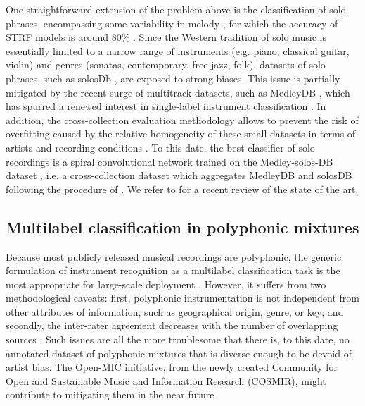 \documentclass{article}
\makeatletter
\newcommand*{\eg}{e.g.\@\xspace}
\newcommand*{\ie}{i.e.\@\xspace}
\makeatother
\begin{document}
One straightforward extension of the problem above is the classification of solo phrases, encompassing some variability in melody \cite{krishna2004icassp}, for which the accuracy of STRF models is around $80\%$ \cite{patil2015eurasip}.
Since the Western tradition of solo music is essentially limited to a narrow range of instruments (\eg{} piano, classical guitar, violin) and genres (sonatas, contemporary, free jazz, folk), datasets of solo phrases, such as solosDb \cite{joder2009taslp}, are exposed to strong biases.
This issue is partially mitigated by the recent surge of multitrack datasets, such as MedleyDB \cite{bittner2014ismir}, which has spurred a renewed interest in single-label instrument classification \cite{yip2017ismir}.
In addition, the cross-collection evaluation methodology \cite{livshin2003ismir} allows to prevent the risk of overfitting caused by the relative homogeneity of these small datasets in terms of artists and recording conditions \cite{bogdanov2016ismir}.
To this date, the best classifier of solo recordings is a spiral convolutional network \cite{lostanlen2016ismir} trained on the Medley-solos-DB dataset \cite{lostanlen2018msdb}, \ie{} a cross-collection dataset which aggregates MedleyDB and solosDB following the procedure of \cite{donnelly2015icdmw}.
We refer to \cite{han2017taslp} for a recent review of the state of the art.

\subsection{Multilabel classification in polyphonic mixtures}
Because most publicly released musical recordings are polyphonic, the generic formulation of instrument recognition as a multilabel classification task is the most appropriate for large-scale deployment \cite{martins2007ismir,burred2009icassp}.
However, it suffers from two methodological caveats: first, polyphonic instrumentation is not independent from other attributes of information, such as geographical origin, genre, or key; and secondly, the inter-rater agreement decreases with the number of overlapping sources \cite[chapter 6]{fuhrmann2012phd}.
Such issues are all the more troublesome that there is, to this date, no  annotated dataset of polyphonic mixtures that is diverse enough to be devoid of artist bias.
The Open-MIC initiative, from the newly created Community for Open and Sustainable Music and Information Research (COSMIR), might contribute to mitigating them in the near future \cite{mcfee2016ismir}.
\end{document}
